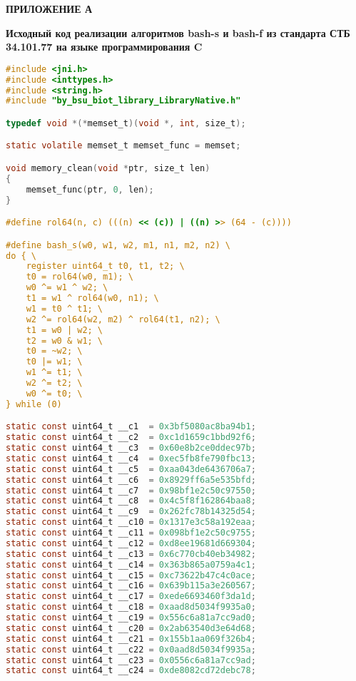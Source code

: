 \newpage

\begin{flushright}{\bf \Large ПРИЛОЖЕНИЕ А}\end{flushright}
\begin{center}
{\bf Исходный код реализации алгоритмов bash-s и bash-f из стандарта СТБ 34.101.77 на языке 
	программирования C}
\end{center}


\begin{lstlisting}[language=C, label=bash-code]
#include <jni.h>
#include <inttypes.h>
#include <string.h>
#include "by_bsu_biot_library_LibraryNative.h"

typedef void *(*memset_t)(void *, int, size_t);

static volatile memset_t memset_func = memset;

void memory_clean(void *ptr, size_t len)
{
	memset_func(ptr, 0, len);
}

#define rol64(n, c) (((n) << (c)) | ((n) >> (64 - (c))))

#define bash_s(w0, w1, w2, m1, n1, m2, n2) \
do { \
	register uint64_t t0, t1, t2; \
	t0 = rol64(w0, m1); \
	w0 ^= w1 ^ w2; \
	t1 = w1 ^ rol64(w0, n1); \
	w1 = t0 ^ t1; \
	w2 ^= rol64(w2, m2) ^ rol64(t1, n2); \
	t1 = w0 | w2; \
	t2 = w0 & w1; \
	t0 = ~w2; \
	t0 |= w1; \
	w1 ^= t1; \
	w2 ^= t2; \
	w0 ^= t0; \
} while (0)

static const uint64_t __c1  = 0x3bf5080ac8ba94b1;
static const uint64_t __c2  = 0xc1d1659c1bbd92f6;
static const uint64_t __c3  = 0x60e8b2ce0ddec97b;
static const uint64_t __c4  = 0xec5fb8fe790fbc13;
static const uint64_t __c5  = 0xaa043de6436706a7;
static const uint64_t __c6  = 0x8929ff6a5e535bfd;
static const uint64_t __c7  = 0x98bf1e2c50c97550;
static const uint64_t __c8  = 0x4c5f8f162864baa8;
static const uint64_t __c9  = 0x262fc78b14325d54;
static const uint64_t __c10 = 0x1317e3c58a192eaa;
static const uint64_t __c11 = 0x098bf1e2c50c9755;
static const uint64_t __c12 = 0xd8ee19681d669304;
static const uint64_t __c13 = 0x6c770cb40eb34982;
static const uint64_t __c14 = 0x363b865a0759a4c1;
static const uint64_t __c15 = 0xc73622b47c4c0ace;
static const uint64_t __c16 = 0x639b115a3e260567;
static const uint64_t __c17 = 0xede6693460f3da1d;
static const uint64_t __c18 = 0xaad8d5034f9935a0;
static const uint64_t __c19 = 0x556c6a81a7cc9ad0;
static const uint64_t __c20 = 0x2ab63540d3e64d68;
static const uint64_t __c21 = 0x155b1aa069f326b4;
static const uint64_t __c22 = 0x0aad8d5034f9935a;
static const uint64_t __c23 = 0x0556c6a81a7cc9ad;
static const uint64_t __c24 = 0xde8082cd72debc78;


\end{lstlisting}

